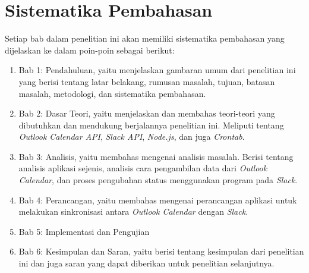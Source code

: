\section{Sistematika Pembahasan}
\label{sec:sispem}
Setiap bab dalam penelitian ini akan memiliki sistematika pembahasan yang dijelaskan ke dalam poin-poin sebagai berikut:
\begin{enumerate}
	\item Bab 1: Pendahuluan, yaitu menjelaskan gambaran umum dari penelitian ini yang berisi tentang latar belakang, rumusan masalah, tujuan, batasan masalah, metodologi, dan sistematika pembahasan.
	\item Bab 2: Dasar Teori, yaitu menjelaskan dan membahas teori-teori yang dibutuhkan dan mendukung berjalannya penelitian ini. Meliputi tentang \textit{Outlook Calendar API}, \textit{Slack API}, \textit{Node.js}, dan juga \textit{Crontab}. 
	\item Bab 3: Analisis, yaitu membahas mengenai analisis masalah. Berisi tentang analisis aplikasi sejenis, analisis cara pengambilan data dari \textit{Outlook Calendar}, dan proses pengubahan status menggunakan program pada \textit{Slack}.
	\item Bab 4: Perancangan, yaitu membahas mengenai perancangan aplikasi untuk melakukan sinkronisasi antara \textit{Outlook Calendar} dengan \textit{Slack}. 
	\item Bab 5: Implementasi dan Pengujian 
	\item Bab 6: Kesimpulan dan Saran, yaitu berisi tentang kesimpulan dari penelitian ini dan juga saran yang dapat diberikan untuk penelitian selanjutnya.  
\end{enumerate}